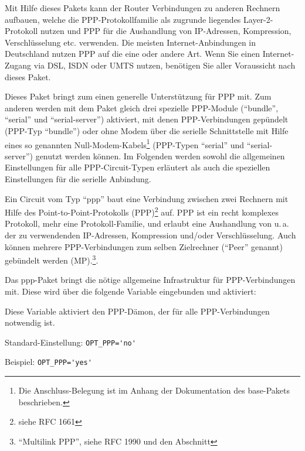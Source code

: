 
Mit Hilfe dieses Pakets kann der Router Verbindungen zu anderen Rechnern
aufbauen, welche die PPP-Protokollfamilie als zugrunde liegendes
Layer-2-Protokoll nutzen und PPP für die Aushandlung von IP-Adressen,
Kompression, Verschlüsselung etc. verwenden. Die meisten Internet-Anbindungen in
Deutschland nutzen PPP auf die eine oder andere Art. Wenn Sie einen
Internet-Zugang via DSL, ISDN oder UMTS nutzen, benötigen Sie aller Voraussicht
nach dieses Paket.

Dieses Paket bringt zum einen generelle Unterstützung für PPP mit. Zum anderen
werden mit dem Paket gleich drei spezielle PPP-Module (``bundle'', ``serial''
und ``serial-server'') aktiviert, mit denen PPP-Verbindungen gepündelt (PPP-Typ
``bundle'') oder ohne Modem über die serielle Schnittstelle mit Hilfe eines so
genannten Null-Modem-Kabels\footnote{Die Anschluss-Belegung ist im Anhang der
Dokumentation des base-Pakets beschrieben.} (PPP-Typen ``serial'' und
``serial-server'') genutzt werden können. Im Folgenden werden sowohl die
allgemeinen Einstellungen für alle PPP-Circuit-Typen erläutert als auch die
speziellen Einstellungen für die serielle Anbindung.


Ein Circuit vom Typ ``ppp'' baut eine Verbindung zwischen zwei Rechnern mit
Hilfe des Point-to-Point-Protokolls (PPP)\footnote{siehe RFC 1661}
auf. PPP ist ein recht komplexes Protokoll, mehr eine Protokoll-Familie, und
erlaubt eine Aushandlung von u.\,a. der zu verwendenden IP-Adressen, Kompression
und/oder Verschlüsselung. Auch können mehrere PPP-Verbindungen zum selben
Zielrechner (``Peer'' genannt) gebündelt werden (MP).\footnote{
``Multilink PPP'', siehe RFC 1990 und den Abschnitt
}.

Das ppp-Paket bringt die nötige allgemeine Infrastruktur für PPP-Verbindungen
mit. Diese wird über die folgende Variable eingebunden und aktiviert:

\begin{description}

Diese Variable aktiviert den PPP-Dämon, der für alle PPP-Verbindungen notwendig
ist.

Standard-Einstellung: \verb+OPT_PPP='no'+

Beispiel: \verb+OPT_PPP='yes'+

\end{description}

